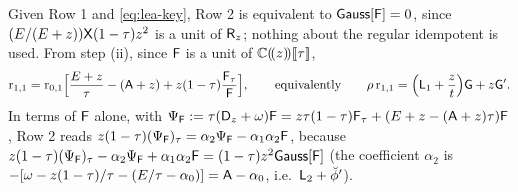 Given Row 1 and \eqref{eq:lea-key}, Row 2 is equivalent to $\mathsf{Gauss}[\mathsf{F}] = 0$, since $(E/(E+z))\mathsf{X}(1-\tau)z^2$ is a unit of $\mathsf{R}_{z}$; nothing about the regular idempotent is used. From step (ii), since $\mathsf{F}$ is a unit of $\mathbb{C}(\!(z)\!)[\![ \tau ]\!]$,
\begin{equation}
\label{eq:lea-Hrow}
\mathrm{r}_{1,1} = \mathrm{r}_{0,1}\Bigl[\frac{E+z}{\tau} - (\mathsf{A}+z) + z(1-\tau)\frac{\mathsf{F}_\tau}{\mathsf{F}}\Bigr],\qquad\text{equivalently}\qquad \rho\,\mathrm{r}_{1,1} = \Bigl(\mathsf{L}_1 + \frac{z}{t}\Bigr)\mathsf{G} + z\mathsf{G}' .
\end{equation}
In terms of $\mathsf{F}$ alone, with $\Psi_{\mathsf{F}} := \tau(\mathsf{D}_{z}+\omega)\mathsf{F} = z\tau(1-\tau)\mathsf{F}_\tau + (E+z-(\mathsf{A}+z)\tau)\mathsf{F}$, Row 2 reads $z(1-\tau)(\Psi_{\mathsf{F}})_\tau = \alpha_2\Psi_{\mathsf{F}} - \alpha_1\alpha_2\mathsf{F}$, because $z(1-\tau)(\Psi_{\mathsf{F}})_\tau - \alpha_2\Psi_{\mathsf{F}} + \alpha_1\alpha_2\mathsf{F} = (1-\tau)z^2\mathsf{Gauss}[\mathsf{F}]$ (the coefficient $\alpha_2$ is $-[\omega - z(1-\tau)/\tau - (E/\tau-\alpha_0)] = \mathsf{A} - \alpha_0$, i.e.\ $\mathsf{L}_2 + \breve{\phi}'$).

